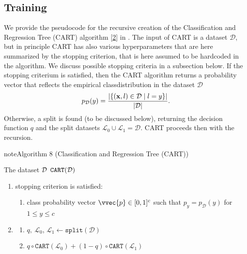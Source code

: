 \documentclass[letterpaper,10pt,english]{jupyterBook}
\begin{document}
\subsection{Training}
\label{\detokenize{classification_decision_trees:training}}
\sphinxAtStartPar
We provide the pseudocode for the recursive creation of the Classification and Regression Tree (CART) algorithm {[}\hyperlink{cite.bibliography:id8}{2}{]} in {\hyperref[\detokenize{classification_decision_trees:dt_training}]{}}. The input of CART is a dataset \(\mathcal{D}\), but in principle CART has also various hyperparameters that are here summarized by the stopping criterion, that is here assumed to be hard\sphinxhyphen{}coded in the algorithm. We discuss possible stopping criteria in a subsection below. If the stopping criterium is satisfied, then the CART algorithm returns a probability vector that reflects the empirical class\sphinxhyphen{}distribution in the dataset \(\mathcal{D}\)
\begin{align*}
p_{\cal D} (y) = \frac{\lvert\{({\bf x}, l) \in {\cal D}\mid  l = y \}\rvert}{\lvert{\cal D}\rvert}. 
\end{align*}
\sphinxAtStartPar
Otherwise, a split is found (to be discussed below), returning the decision function \(q\) and the split datasets \(\mathcal{L}_0\cup \mathcal{L}_1 = \mathcal{D}\). CART proceeds then with the recursion.
\label{classification_decision_trees:dt_training}
\begin{sphinxadmonition}{note}{Algorithm 8 (Classification and Regression Tree (CART))}



\sphinxAtStartPar
{} The dataset \({\cal D} \) \(\mathtt{CART}({\cal D})\)
\begin{enumerate}
%
\item {} 
\sphinxAtStartPar
{} stopping criterion is satisfied:
\begin{enumerate}
%
\item {} 
\sphinxAtStartPar
{} class probability vector \(\vvec{p}\in[0,1]^c\) such that \(p_y = p_\mathcal{D}(y)\) for \(1\leq y\leq c\)

\end{enumerate}

\item {} 
\sphinxAtStartPar
{}
\begin{enumerate}
%
\item {} 
\sphinxAtStartPar
\(q,\ \mathcal{L}_0\), \(\mathcal{L}_1\leftarrow\mathtt{split}(\mathcal{D})\)

\item {} 
\sphinxAtStartPar
{} \(q\circ \mathtt{CART}(\mathcal{L}_0) + (1-q) \circ \mathtt{CART}(\mathcal{L}_1) \)

\end{enumerate}

\end{enumerate}
\end{sphinxadmonition}
\end{document}
